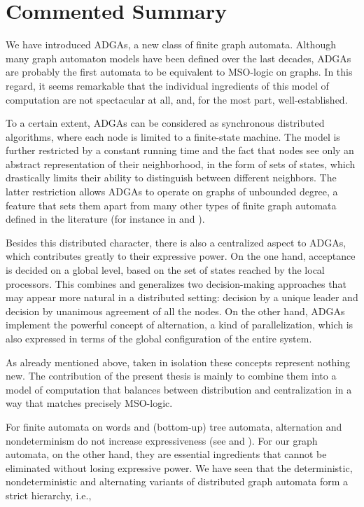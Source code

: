 \documentclass[a4paper,11pt,twoside]{report} \pdfoutput=1
\begin{document}
\section{Commented Summary}
We have introduced ADGAs, a new class of finite graph
automata. Although many graph automaton models have been defined over
the last decades, ADGAs are probably the first automata to be
equivalent to MSO-logic on graphs. In this regard, it seems remarkable
that the individual ingredients of this model of computation are not
spectacular at all, and, for the most part, well-established.

To a certain extent, ADGAs can be considered as synchronous
distributed algorithms, where each node is limited to a finite-state
machine. The model is further restricted by a constant running time
and the fact that nodes see only an abstract representation of their
neighborhood, in the form of sets of states, which drastically limits
their ability to distinguish between different neighbors. The latter
restriction allows ADGAs to operate on graphs of unbounded degree, a
feature that sets them apart from many other types of finite graph
automata defined in the literature (for instance in \cite{WR79} and
\cite{Tho91}).

Besides this distributed character, there is also a centralized aspect
to ADGAs, which contributes greatly to their expressive power. On the
one hand, acceptance is decided on a global level, based on the set of
states reached by the local processors. This combines and generalizes
two decision-making approaches that may appear more natural in a
distributed setting: decision by a unique leader and decision by
unanimous agreement of all the nodes. On the other hand, ADGAs
implement the powerful concept of alternation, a kind of
parallelization, which is also expressed in terms of the global
configuration of the entire system.

As already mentioned above, taken in isolation these concepts
represent nothing new. The contribution of the present thesis is
mainly to combine them into a model of computation that balances
between distribution and centralization in a way that matches
precisely MSO-logic.

For finite automata on words and (bottom-up) tree automata,
alternation and nondeterminism do not increase expressiveness (see
\cite[Thm~5.2]{CKS81} and \cite[Thm~7.4.1]{TATA08}). For our graph
automata, on the other hand, they are essential ingredients that
cannot be eliminated without losing expressive power. We have seen
that the deterministic, nondeterministic and alternating variants of
distributed graph automata form a strict hierarchy, i.e.,
\end{document}
